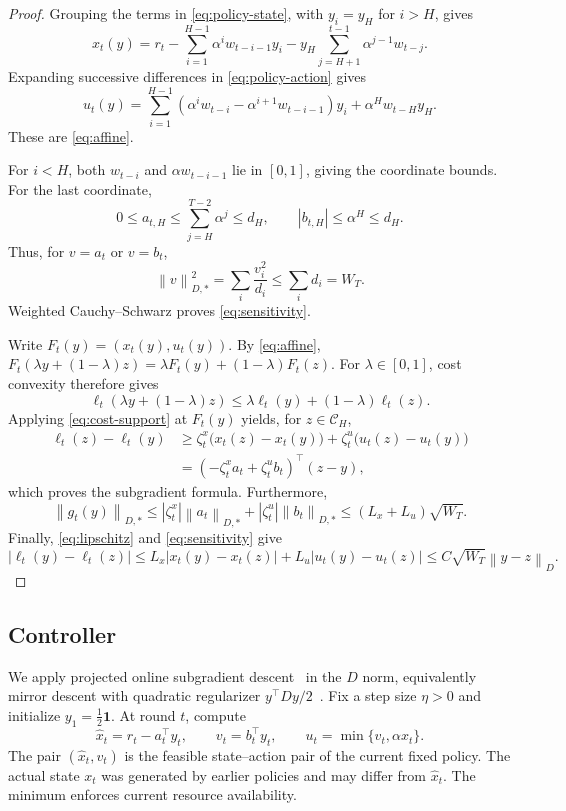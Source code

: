 \documentclass[11pt]{article}
\newcommand{\CH}{\mathcal C_H}
\newcommand{\normD}[1]{\left\lVert #1\right\rVert_D}
\newcommand{\normDual}[1]{\left\lVert #1\right\rVert_{D,*}}
\begin{document}
\begin{proof}
Grouping the terms in \eqref{eq:policy-state}, with $y_i=y_H$
for $i>H$, gives
\[
x_t(y)
=
r_t-\sum_{i=1}^{H-1}\alpha^i w_{t-i-1}y_i
-y_H\sum_{j=H+1}^{t-1}\alpha^{j-1}w_{t-j}.
\]
Expanding successive differences in \eqref{eq:policy-action}
gives
\[
u_t(y)
=
\sum_{i=1}^{H-1}
(\alpha^i w_{t-i}-\alpha^{i+1}w_{t-i-1})y_i
+\alpha^H w_{t-H}y_H.
\]
These are \eqref{eq:affine}.

For $i<H$, both $w_{t-i}$ and $\alpha w_{t-i-1}$ lie in
$[0,1]$, giving the coordinate bounds. For the last coordinate,
\[
0\le a_{t,H}\le\sum_{j=H}^{T-2}\alpha^j\le d_H,
\qquad
|b_{t,H}|\le\alpha^H\le d_H.
\]
Thus, for $v=a_t$ or $v=b_t$,
\[
\normDual{v}^2
=
\sum_i\frac{v_i^2}{d_i}
\le\sum_i d_i=W_T.
\]
Weighted Cauchy--Schwarz proves \eqref{eq:sensitivity}.

Write $F_t(y)=(x_t(y),u_t(y))$. By \eqref{eq:affine},
$F_t(\lambda y+(1-\lambda)z)=\lambda F_t(y)+(1-\lambda)F_t(z)$.
For $\lambda\in[0,1]$, cost convexity therefore gives
\[
\ell_t(\lambda y+(1-\lambda)z)
\le\lambda\ell_t(y)+(1-\lambda)\ell_t(z).
\]
Applying \eqref{eq:cost-support} at $F_t(y)$ yields, for $z\in\CH$,
\begin{align*}
\ell_t(z)-\ell_t(y)
&\ge \zeta_t^x\bigl(x_t(z)-x_t(y)\bigr)
+\zeta_t^u\bigl(u_t(z)-u_t(y)\bigr)\\
&=(-\zeta_t^x a_t+\zeta_t^u b_t)^\top(z-y),
\end{align*}
which proves the subgradient formula. Furthermore,
\[
\normDual{g_t(y)}
\le|\zeta_t^x|\normDual{a_t}
+|\zeta_t^u|\normDual{b_t}
\le(L_x+L_u)\sqrt{W_T}.
\]
Finally, \eqref{eq:lipschitz} and \eqref{eq:sensitivity} give
\[
|\ell_t(y)-\ell_t(z)|
\le L_x|x_t(y)-x_t(z)|+L_u|u_t(y)-u_t(z)|
\le C\sqrt{W_T}\normD{y-z}.
\]
\end{proof}

\subsection{Controller}

We apply projected online subgradient
descent~\cite{zinkevich2003online} in the $D$ norm, equivalently
mirror descent with quadratic regularizer
$y^\top Dy/2$~\cite{beck2003mirror}.
Fix a step size $\eta>0$ and initialize
$y_1=\frac12\mathbf1$. At round $t$, compute
\begin{equation}
\label{eq:controller-action}
\widehat x_t=r_t-a_t^\top y_t,
\qquad
v_t=b_t^\top y_t,
\qquad
u_t=\min\{v_t,\alpha x_t\}.
\end{equation}
The pair $(\widehat x_t,v_t)$ is the feasible state--action
pair of the current fixed policy. The actual state $x_t$ was
generated by earlier policies and may differ from $\widehat x_t$.
The minimum enforces current resource availability.
\end{document}

